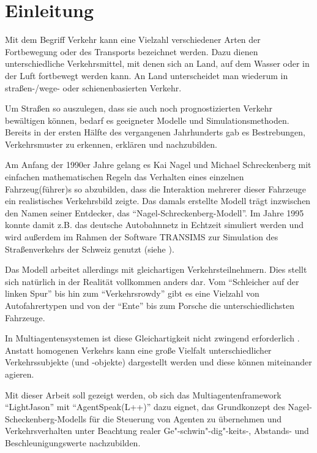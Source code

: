 \section{Einleitung}
\label{sec:einleitung}

Mit dem Begriff Verkehr kann eine Vielzahl verschiedener Arten der Fortbewegung oder des Transports bezeichnet werden. 
Dazu dienen unterschiedliche Verkehrsmittel, mit denen sich an Land, auf dem Wasser oder in der Luft fortbewegt werden kann.
An Land unterscheidet man wiederum in \mbox{straßen-/}wege- oder schienenbasierten Verkehr.

Um Straßen so auszulegen, dass sie auch noch prognostizierten Verkehr bewältigen können, bedarf es geeigneter Modelle und Simulationsmethoden.
Bereits in der ersten Hälfte des  vergangenen Jahrhunderts gab es Bestrebungen, Verkehrsmuster zu erkennen, erklären und nachzubilden.

Am Anfang der 1990er Jahre gelang es Kai Nagel und Michael Schreckenberg mit einfachen mathematischen Regeln das Verhalten eines einzelnen Fahrzeug(führer)s so abzubilden, dass die Interaktion mehrerer dieser Fahrzeuge ein realistisches Verkehrsbild zeigte.
Das damals erstellte Modell trägt inzwischen den Namen seiner Entdecker, das \enquote{Nagel-Schreckenberg-Modell}. Im Jahre 1995 konnte damit z.B. das deutsche Autobahnnetz in Echtzeit simuliert werden und wird außerdem im Rahmen der Software TRANSIMS zur Simulation des Straßenverkehrs der Schweiz genutzt (siehe \cite[S. 33]{spahn-da}).

Das Modell arbeitet allerdings mit gleichartigen Verkehrsteilnehmern.
Dies stellt sich natürlich in der Realität vollkommen anders dar.
Vom \enquote{Schleicher auf der linken Spur} bis hin zum \enquote{Verkehrsrowdy} gibt es eine Vielzahl von Autofahrertypen und von der \enquote{Ente} bis zum Porsche die unterschiedlichsten Fahrzeuge.

In Multiagentensystemen ist diese Gleichartigkeit nicht zwingend erforderlich \cite[S. 2]{inhomogen-agent}. Anstatt homogenen Verkehrs kann eine große Vielfalt unterschiedlicher Verkehrssubjekte (und -objekte) dargestellt werden und diese können miteinander agieren.

Mit dieser Arbeit soll gezeigt werden, ob sich das Multiagentenframework \enquote{LightJason} mit \enquote{AgentSpeak(L++)} dazu eignet, das Grundkonzept des Nagel-Scheckenberg-Modells für die Steuerung von Agenten zu übernehmen und Verkehrsverhalten unter Beachtung realer Ge"-schwin"-dig"-keits-, Abstands- und Beschleunigungswerte nachzubilden.



